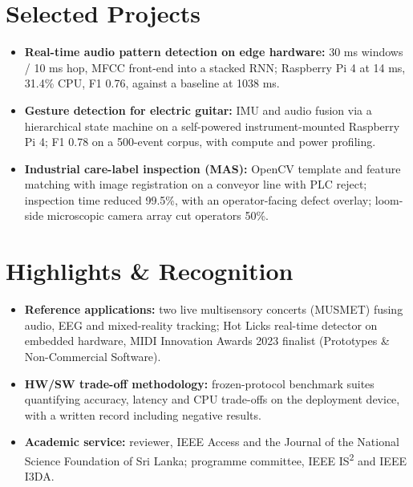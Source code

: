 \documentclass[11pt]{article}
\begin{document}
\section*{Selected Projects \footnotesize {}}
\begin{itemize}[leftmargin=1.2em, itemsep=-0.25em]
    \item \textbf{Real-time audio pattern detection on edge hardware:} 30 ms windows / 10 ms hop, MFCC front-end into a stacked RNN; Raspberry Pi 4 at 14 ms, 31.4\% CPU, F1 0.76, against a baseline at 1038 ms.
    \item \textbf{Gesture detection for electric guitar:} IMU and audio fusion via a hierarchical state machine on a self-powered instrument-mounted Raspberry Pi 4; F1 0.78 on a 500-event corpus, with compute and power profiling.
    \item \textbf{Industrial care-label inspection (MAS):} OpenCV template and feature matching with image registration on a conveyor line with PLC reject; inspection time reduced 99.5\%, with an operator-facing defect overlay; loom-side microscopic camera array cut operators 50\%.
\end{itemize}

\vspace{-0.5em}
\section*{Highlights \& Recognition}
\begin{itemize}[leftmargin=1.2em, itemsep=-0.25em]
    \item \textbf{Reference applications:} two live multisensory concerts (MUSMET) fusing audio, EEG and mixed-reality tracking; Hot Licks real-time detector on embedded hardware, MIDI Innovation Awards 2023 finalist (Prototypes \& Non-Commercial Software).
    \item \textbf{HW/SW trade-off methodology:} frozen-protocol benchmark suites quantifying accuracy, latency and CPU trade-offs on the deployment device, with a written record including negative results.
    \item \textbf{Academic service:} reviewer, IEEE Access and the Journal of the National Science Foundation of Sri Lanka; programme committee, IEEE IS\textsuperscript{2} and IEEE I3DA.
\end{itemize}
\end{document}
